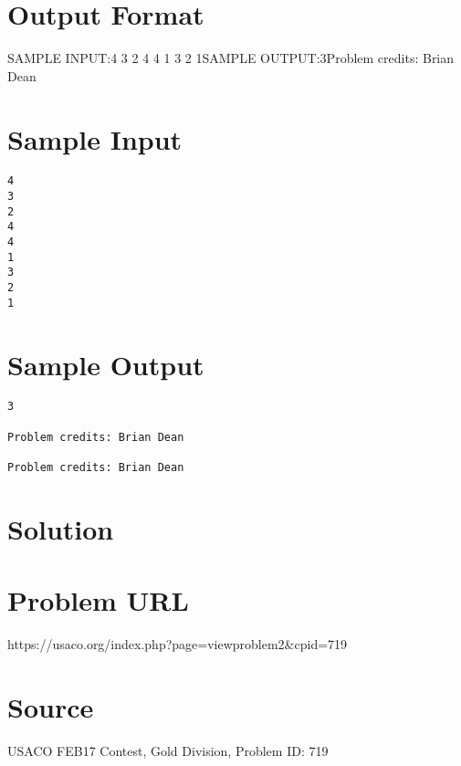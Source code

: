\documentclass[12pt]{article}
\begin{document}
\section*{Output Format}
SAMPLE INPUT:4
3
2
4
4
1
3
2
1SAMPLE OUTPUT:3Problem credits: Brian Dean

\section*{Sample Input}
\begin{verbatim}
4
3
2
4
4
1
3
2
1
\end{verbatim}

\section*{Sample Output}
\begin{verbatim}
3

Problem credits: Brian Dean

Problem credits: Brian Dean
\end{verbatim}

\section*{Solution}


\section*{Problem URL}
https://usaco.org/index.php?page=viewproblem2&cpid=719

\section*{Source}
USACO FEB17 Contest, Gold Division, Problem ID: 719
\end{document}
